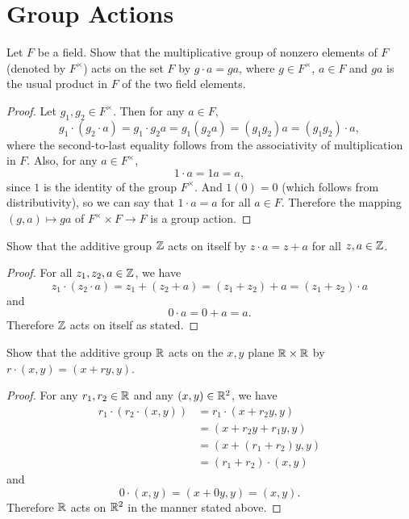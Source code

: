 \section{Group Actions}

 Let $F$ be a field. Show that the multiplicative group of
nonzero elements of $F$ (denoted by $F^\times$) acts on the set $F$ by
$g\cdot a = ga$, where $g\in F^\times$, $a\in F$ and $ga$ is the usual
product in $F$ of the two field elements.
\begin{proof}
  Let $g_1,g_2\in F^\times$. Then for any $a\in F$,
  \begin{equation*}
    g_1\cdot(g_2\cdot a) = g_1\cdot g_2a = g_1(g_2a) = (g_1g_2)a
    = (g_1g_2)\cdot a,
  \end{equation*}
  where the second-to-last equality follows from the associativity of
  multiplication in $F$. Also, for any $a\in F^\times$,
  \begin{equation*}
    1\cdot a = 1a = a,
  \end{equation*}
  since $1$ is the identity of the group $F^\times$. And $1(0) = 0$
  (which follows from distributivity), so we can say that
  $1\cdot a = a$ for all $a\in F$. Therefore the mapping
  $(g, a)\mapsto ga$ of $F^\times\times F\to F$ is a group action.
\end{proof}

 Show that the additive group $\mathbb{Z}$ acts on itself by
$z\cdot a = z + a$ for all $z,a\in\mathbb{Z}$.
\begin{proof}
  For all $z_1,z_2,a\in\mathbb{Z}$, we have
  \begin{equation*}
    z_1\cdot(z_2\cdot a) = z_1 + (z_2 + a)
    = (z_1 + z_2) + a = (z_1 + z_2)\cdot a
  \end{equation*}
  and
  \begin{equation*}
    0\cdot a = 0 + a = a.
  \end{equation*}
  Therefore $\mathbb{Z}$ acts on itself as stated.
\end{proof}

 Show that the additive group $\mathbb{R}$ acts on the $x,y$ plane
$\mathbb{R}\times\mathbb{R}$ by $r\cdot(x,y) = (x + ry, y)$.
\begin{proof}
  For any $r_1,r_2\in\mathbb{R}$ and any $(x,y)\in\mathbb{R}^2$, we have
  \begin{align*}
    r_1\cdot(r_2\cdot(x,y))
    &= r_1\cdot(x + r_2y, y) \\
    &= (x + r_2y + r_1y, y) \\
    &= (x + (r_1 + r_2)y, y) \\
    &= (r_1 + r_2)\cdot(x,y)
  \end{align*}
  and
  \begin{equation*}
    0\cdot(x,y) = (x + 0y, y) = (x,y).
  \end{equation*}
  Therefore $\mathbb{R}$ acts on $\mathbb{R}^2$ in the manner stated above.
\end{proof}

